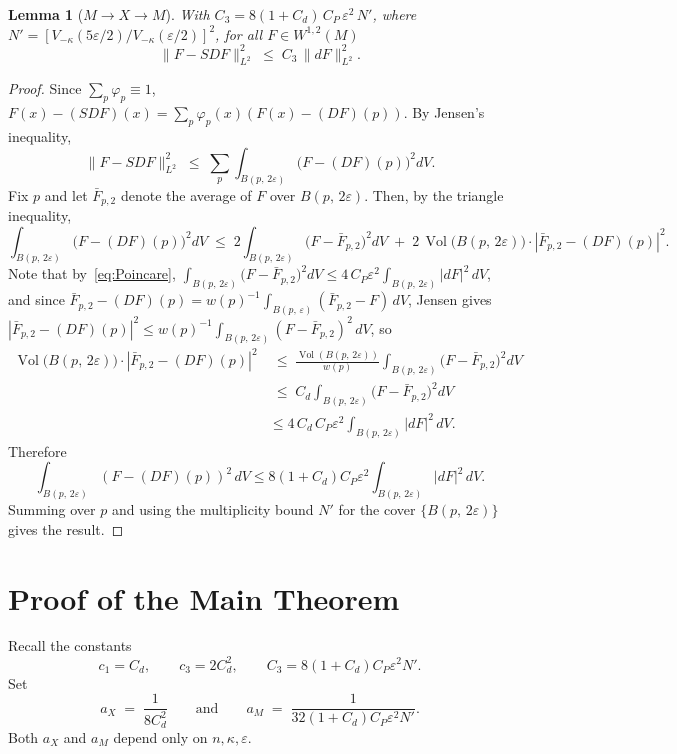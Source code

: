 \documentclass[10pt,reqno]{amsart}
\newtheorem{lemma}[theorem]{Lemma}
\theoremstyle{remark}
\newcommand{\Vol}{\operatorname{Vol}}
\newcommand{\norml}[1]{\lVert #1 \rVert_{L^{2}}}
\newcommand{\Vk}{V_{-\kappa}}
\newcommand{\B}[2]{B(#1,\,#2)}
\begin{document}
\begin{lemma}[$M\to X\to M$]
\label{lem:compMXM}
With $C_3 = 8(1+C_d)\,C_P\,\varepsilon^2\,N'$, where
$N'=[\Vk(5\varepsilon/2)/\Vk(\varepsilon/2)]^2$,
for all $F\in W^{1,2}(M)$
\[
  \norml{F-SDF}^2 \;\leq\; C_3\,\norml{dF}^2.
\]
\end{lemma}

\begin{proof}
Since $\sum_p\varphi_p\equiv 1$,
$F(x)-(SDF)(x)=\sum_p\varphi_p(x)(F(x)-(DF)(p))$.
By Jensen's inequality,
\[
  \norml{F-SDF}^2
  \;\leq\;
  \sum_p\int_{\B{p}{2\varepsilon}}\bigl(F-(DF)(p)\bigr)^2 dV.
\]
Fix $p$ and let $\bar{F}_{p,2}$ denote the average of $F$ over
$\B{p}{2\varepsilon}$.
Then, by the triangle inequality,
\[
  \int_{\B{p}{2\varepsilon}}\!\bigl(F-(DF)(p)\bigr)^2 dV
  \;\leq\;
  2\int_{\B{p}{2\varepsilon}}\!\bigl(F-\bar{F}_{p,2}\bigr)^2 dV
  \;+\;
  2\,\Vol\!\bigl(\B{p}{2\varepsilon}\bigr)\cdot|\bar{F}_{p,2}-(DF)(p)|^2.
\]
Note that by~\eqref{eq:Poincare},
$\int_{\B{p}{2\varepsilon}}\!\bigl(F-\bar{F}_{p,2}\bigr)^2 dV \leq 4\,C_P\varepsilon^2\int_{\B{p}{2\varepsilon}}|dF|^2\,dV$, and since
$\bar{F}_{p,2}-(DF)(p)=w(p)^{-1}\int_{\B{p}{\varepsilon}}(\bar{F}_{p,2}-F)\,dV$,
Jensen gives
$|\bar{F}_{p,2}-(DF)(p)|^2\leq w(p)^{-1}\int_{\B{p}{2\varepsilon}}(F-\bar{F}_{p,2})^2\,dV$,
so
\begin{equation*}
    \begin{split}
    \Vol\!\bigl(\B{p}{2\varepsilon}\bigr)\cdot|\bar{F}_{p,2}-(DF)(p)|^2
  & \;\leq\;
  \frac{\Vol(\B{p}{2\varepsilon})}{w(p)}
  \int_{\B{p}{2\varepsilon}}\!\bigl(F-\bar{F}_{p,2}\bigr)^2 dV \\
  & \;\leq\;
  C_d\int_{\B{p}{2\varepsilon}}\!\bigl(F-\bar{F}_{p,2}\bigr)^2 dV \\
  & \leq 4\,C_d\,C_P\varepsilon^2\int_{\B{p}{2\varepsilon}}|dF|^2\,dV.
    \end{split}
\end{equation*}
Therefore
\[\int_{\B{p}{2\varepsilon}}(F-(DF)(p))^2\,dV
 \leq 8(1+C_d)C_P\varepsilon^2\int_{\B{p}{2\varepsilon}}|dF|^2\,dV.\]
Summing over $p$ and using the multiplicity bound $N'$ for the cover
$\{\B{p}{2\varepsilon}\}$ gives the result.
\end{proof}

\section{Proof of the Main Theorem}
\label{sec:main}
Recall the constants
\[
c_1=C_d,\qquad
c_3=2C_d^2,\qquad
C_3=8(1+C_d)C_P\varepsilon^2N'.
\] Set
\[
  a_X \;=\; \frac{1}{8C_d^2}
  \qquad\text{and}\qquad
  a_M \;=\; \frac{1}{32(1+C_d)C_P\varepsilon^2 N'}.
\]
Both $a_X$ and $a_M$ depend only on $n,\kappa,\varepsilon$.
\end{document}
